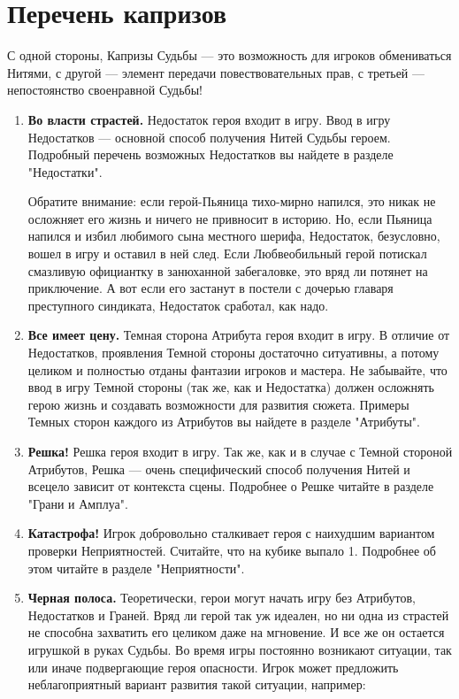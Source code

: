\section{Перечень капризов}
С одной стороны, Капризы Судьбы — это возможность для игроков обмениваться Нитями, с другой — элемент передачи повествовательных прав, с третьей — непостоянство своенравной Судьбы!
\begin{enumerate}
\item \textbf{Во власти страстей.}
Недостаток героя входит в игру. Ввод в игру Недостатков — основной способ получения Нитей Судьбы героем. Подробный перечень возможных Недостатков вы найдете в разделе "Недостатки".
\begin{tcolorbox}
Обратите внимание: если герой-Пьяница тихо-мирно напился, это никак не осложняет его жизнь и ничего не привносит в историю. Но, если Пьяница напился и избил любимого сына местного шерифа, Недостаток, безусловно, вошел в игру и оставил в ней след. Если Любвеобильный герой потискал смазливую официантку в занюханной забегаловке, это вряд ли потянет на приключение. А вот если его застанут в постели с дочерью главаря преступного синдиката, Недостаток сработал, как надо.
\end{tcolorbox}
\item \textbf{Все имеет цену.}
Темная сторона Атрибута героя входит в игру. В отличие от Недостатков, проявления Темной стороны достаточно ситуативны, а потому целиком и полностью отданы фантазии игроков и мастера. Не забывайте, что ввод в игру Темной стороны (так же, как и Недостатка) должен осложнять герою жизнь и создавать возможности для развития сюжета. Примеры Темных сторон каждого из Атрибутов вы найдете в разделе "Атрибуты".
\item \textbf{Решка!}
Решка героя входит в игру. Так же, как и в случае с Темной стороной Атрибутов, Решка — очень специфический способ получения Нитей и всецело зависит от контекста сцены. Подробнее о Решке читайте в разделе "Грани и Амплуа".
\item \textbf{Катастрофа!}
Игрок добровольно сталкивает героя с наихудшим вариантом проверки Неприятностей. Считайте, что на кубике выпало 1. Подробнее об этом читайте в разделе "Неприятности".
\item \textbf{Черная полоса.}
Теоретически, герои могут начать игру без Атрибутов, Недостатков и Граней. Вряд ли герой так уж идеален, но ни одна из страстей не способна захватить его целиком даже на мгновение. И все же он остается игрушкой в руках Судьбы.
\newline Во время игры постоянно возникают ситуации, так или иначе подвергающие героя опасности. Игрок может предложить неблагоприятный вариант развития такой ситуации, например:

\end{enumerate}
